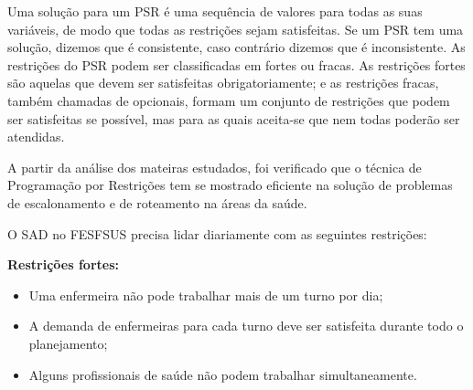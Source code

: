 Uma solução para um PSR é uma sequência de valores para todas as suas variáveis, de modo que todas as restrições sejam satisfeitas.
 Se um PSR tem uma solução, dizemos que é consistente, caso contrário dizemos que é inconsistente.
As restrições do PSR podem ser classificadas em fortes ou fracas. As restrições fortes são aquelas que devem ser satisfeitas obrigatoriamente; e as restrições fracas, também chamadas de opcionais, formam um conjunto de restrições que podem ser satisfeitas se possível, mas para as quais aceita-se que nem todas poderão ser atendidas.

A partir da análise dos mateiras estudados, foi verificado que o técnica de Programação por Restrições tem se mostrado eficiente na solução de problemas de escalonamento e de roteamento na áreas da saúde. 

O \ac{SAD} no \ac{FESFSUS} precisa lidar diariamente com as seguintes restrições:

\textbf{Restrições fortes:}
\begin{itemize}
\item Uma enfermeira não pode trabalhar mais de um turno por dia;
\item A demanda de enfermeiras para cada turno deve ser satisfeita durante todo o planejamento;
\item Alguns profissionais de saúde não podem trabalhar simultaneamente.
\end{itemize}
 
